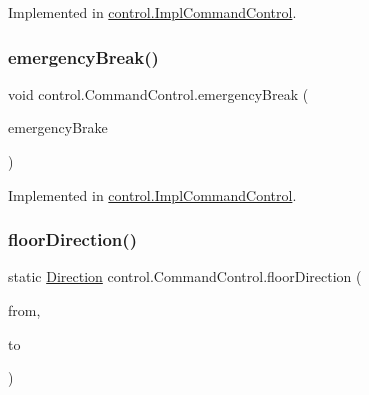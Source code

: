 Implemented in \mbox{\hyperlink{classcontrol_1_1_impl_command_control_a992b195b4521cba044f235fa35f6a9b2}{control.\+Impl\+Command\+Control}}.

\mbox{\label{interfacecontrol_1_1_command_control_a9a32457770712105c8ceffab1c05b95a}} 
\subsubsection{\texorpdfstring{emergencyBreak()}{emergencyBreak()}}
{\footnotesize\ttfamily void control.\+Command\+Control.\+emergency\+Break (\begin{DoxyParamCaption}\item[{\mbox{\hyperlink{classcontrol_1_1command_1_1_emergency_brake}{Emergency\+Brake}}}]{emergency\+Brake }\end{DoxyParamCaption})}



Implemented in \mbox{\hyperlink{classcontrol_1_1_impl_command_control_a1a3e2202d967016c70f6c7e2105fc4c7}{control.\+Impl\+Command\+Control}}.

\mbox{\label{interfacecontrol_1_1_command_control_a22ab7945cd82bb103b59e5d3103288a3}} 
\subsubsection{\texorpdfstring{floorDirection()}{floorDirection()}}
{\footnotesize\ttfamily static \mbox{\hyperlink{enumcontrol_1_1command_1_1_direction}{Direction}} control.\+Command\+Control.\+floor\+Direction (\begin{DoxyParamCaption}\item[{int}]{from,  }\item[{int}]{to }\end{DoxyParamCaption})\hspace{0.3cm}{\ttfamily [static]}}

\mbox{\label{interfacecontrol_1_1_command_control_af668873aadd297c71867fa707b5ecd55}} 
